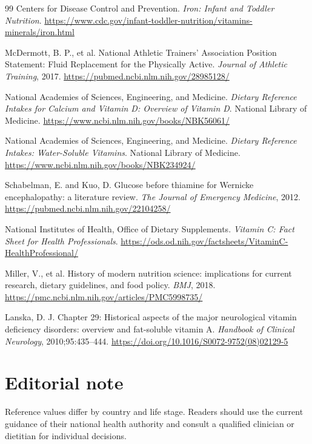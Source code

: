 \begin{thebibliography}{99}
 Centers for Disease Control and Prevention. \emph{Iron: Infant and Toddler Nutrition}. \url{https://www.cdc.gov/infant-toddler-nutrition/vitamins-minerals/iron.html}

 McDermott, B. P., et al. National Athletic Trainers' Association Position Statement: Fluid Replacement for the Physically Active. \emph{Journal of Athletic Training}, 2017. \url{https://pubmed.ncbi.nlm.nih.gov/28985128/}

 National Academies of Sciences, Engineering, and Medicine. \emph{Dietary Reference Intakes for Calcium and Vitamin D: Overview of Vitamin D}. National Library of Medicine. \url{https://www.ncbi.nlm.nih.gov/books/NBK56061/}

 National Academies of Sciences, Engineering, and Medicine. \emph{Dietary Reference Intakes: Water-Soluble Vitamins}. National Library of Medicine. \url{https://www.ncbi.nlm.nih.gov/books/NBK234924/}

 Schabelman, E. and Kuo, D. Glucose before thiamine for Wernicke encephalopathy: a literature review. \emph{The Journal of Emergency Medicine}, 2012. \url{https://pubmed.ncbi.nlm.nih.gov/22104258/}

 National Institutes of Health, Office of Dietary Supplements. \emph{Vitamin C: Fact Sheet for Health Professionals}. \url{https://ods.od.nih.gov/factsheets/VitaminC-HealthProfessional/}

 Miller, V., et al. History of modern nutrition science: implications for current research, dietary guidelines, and food policy. \emph{BMJ}, 2018. \url{https://pmc.ncbi.nlm.nih.gov/articles/PMC5998735/}

 Lanska, D. J. Chapter 29: Historical aspects of the major neurological vitamin deficiency disorders: overview and fat-soluble vitamin A. \emph{Handbook of Clinical Neurology}, 2010;95:435--444. \url{https://doi.org/10.1016/S0072-9752(08)02129-5}
\end{thebibliography}

\section*{Editorial note}
Reference values differ by country and life stage. Readers should use the current guidance of their national health authority and consult a qualified clinician or dietitian for individual decisions.
